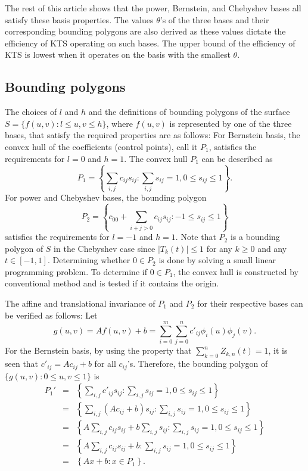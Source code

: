 \documentclass[12pt]{article}
\begin{document}
The rest of this article shows that the power, Bernstein, and Chebyshev
bases all satisfy these basis properties.  The values $\theta$'s of
the three bases and their corresponding bounding polygons are also
derived as these values dictate the efficiency
of KTS operating on such bases.  The upper bound of the efficiency of KTS
is lowest when it operates on the basis with the smallest $\theta$.

\subsection{Bounding polygons}

\label{section_bounding_polygon} The choices of $l$
and $h$ and the definitions of bounding polygons of the surface
$S = \{ f(u,v) : l \leq u,v \leq h\}$, where $f(u,v)$ is represented
by one of the three bases, that satisfy the required properties
are as follows: For Bernstein
basis, the convex hull of the coefficients (control points), call
it $P_1$, satisfies the requirements for $l = 0$ and $h=1$.  The
convex hull $P_1$ can be described as
\begin{equation}
\label{p1def} P_1 = \left\{ \sum_{i,j} c_{ij} s_{ij} : \sum_{i,j}
s_{ij} = 1, 0 \leq s_{ij} \leq 1 \right\}.
\end{equation}
For power and Chebyshev bases, the bounding polygon
\begin{equation}
\label{p2def} P_2 = \left\{ c_{00} + \sum_{i+j > 0} c_{ij} s_{ij} : -1
\leq s_{ij} \leq 1 \right\}
\end{equation}
satisfies the requirements for $l = -1$ and $h = 1$.  Note that
$P_2$ is a bounding polygon of $S$ in the Chebyshev case since $|T_k(t)| \leq 1$
for any $k \geq 0$ and any $t \in [-1,1]$.
Determining whether $0 \in P_2$ is done by solving a small linear programming problem.
To determine if $0 \in P_1$,
the convex hull is constructed by conventional method and is tested if
it contains the origin.

The affine and translational invariance of $P_1$ and $P_2$
for their respective bases can be verified as follows:  Let
\[
g(u,v) = Af(u,v) + b =
\sum_{i=0}^m \sum_{j=0}^n c'_{ij}\phi_i(u)\phi_j(v).
\]
For the Bernstein basis,
by using the property that $\sum_{k=0}^n Z_{k,n}(t) = 1$, it is seen that
$c'_{ij} = Ac_{ij}+b$ for all $c_{ij}$'s.  Therefore, the bounding polygon of
$\{g(u,v): 0 \leq u,v \leq 1 \}$ is
\begin{eqnarray}
P_1' & = & \left\{ \sum_{i,j} c'_{ij} s_{ij} : \sum_{i,j}
s_{ij} = 1, 0 \leq s_{ij} \leq 1 \right\} \nonumber \\
& = & \left\{ \sum_{i,j} (Ac_{ij}+b) s_{ij} : \sum_{i,j}
s_{ij} = 1, 0 \leq s_{ij} \leq 1 \right\} \nonumber \\
& = & \left\{ A\sum_{i,j} c_{ij}s_{ij}+ b\sum_{i,j}s_{ij} : \sum_{i,j}
s_{ij} = 1, 0 \leq s_{ij} \leq 1 \right\} \nonumber \\
& = & \left\{ A\sum_{i,j} c_{ij}s_{ij}+ b : \sum_{i,j}
s_{ij} = 1, 0 \leq s_{ij} \leq 1 \right\} \nonumber \\
& = & \left\{ Ax + b : x \in P_1 \right\}. \nonumber
\end{eqnarray}
\end{document}
